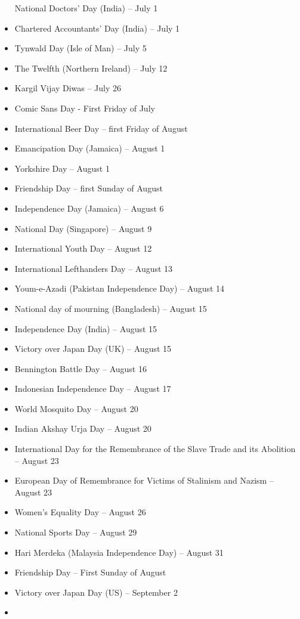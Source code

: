 \documentclass[
  openany]{book}
\begin{document}
\begin{itemize}
  National Doctors' Day (India) -- July 1
\item
  Chartered Accountants' Day (India) -- July 1
\item
  Tynwald Day (Isle of Man) -- July 5
\item
  The Twelfth (Northern Ireland) -- July 12
\item
  Kargil Vijay Diwas -- July 26
\item
  Comic Sans Day - First Friday of July
\item
  International Beer Day -- first Friday of August
\item
  Emancipation Day (Jamaica) -- August 1
\item
  Yorkshire Day -- August 1
\item
  Friendship Day -- first Sunday of August
\item
  Independence Day (Jamaica) -- August 6
\item
  National Day (Singapore) -- August 9
\item
  International Youth Day -- August 12
\item
  International Lefthanders Day -- August 13
\item
  Youm-e-Azadi (Pakistan Independence Day) -- August 14
\item
  National day of mourning (Bangladesh) -- August 15
\item
  Independence Day (India) -- August 15
\item
  Victory over Japan Day (UK) -- August 15
\item
  Bennington Battle Day -- August 16
\item
  Indonesian Independence Day -- August 17
\item
  World Mosquito Day -- August 20
\item
  Indian Akshay Urja Day -- August 20
\item
  International Day for the Remembrance of the Slave Trade and its Abolition -- August 23
\item
  European Day of Remembrance for Victims of Stalinism and Nazism -- August 23
\item
  Women's Equality Day -- August 26
\item
  National Sports Day -- August 29
\item
  Hari Merdeka (Malaysia Independence Day) -- August 31
\item
  Friendship Day -- First Sunday of August
\item
  Victory over Japan Day (US) -- September 2
\item

\end{itemize}
\end{document}
